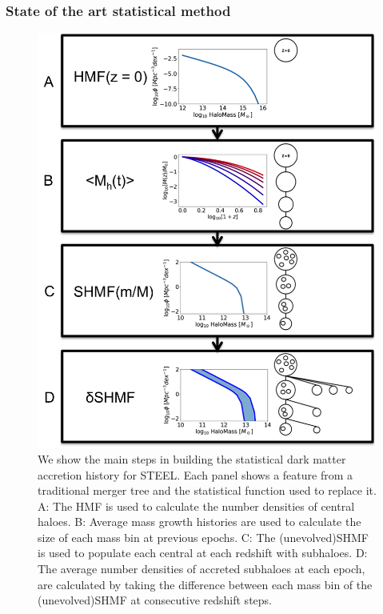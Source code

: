 \subsubsection{State of the art statistical method}
\begin{figure}[h!]
	\centering
	\includegraphics[width = \linewidth]{Figures/Chapter2/StatDM.png}
    \caption{We show the main steps in building the statistical dark matter accretion history for STEEL. Each panel shows a feature from a traditional merger tree and the statistical function used to replace it. A: The HMF is used to calculate the number densities of central haloes. B: Average mass growth histories are used to calculate the size of each mass bin at previous epochs. C: The (unevolved)SHMF is used to populate each central at each redshift with subhaloes. D: The average number densities of accreted subhaloes at each epoch, are calculated by taking the difference between each mass bin of the (unevolved)SHMF at consecutive redshift steps.}
	\label{fig:StatDM}
\end{figure}


